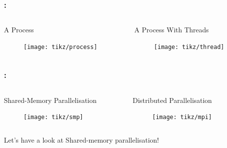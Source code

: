 \documentclass[9pt,xcolor=table]{beamer}
\begin{document}
\begin{frame}
\frametitle{\insertsectionhead{}: \insertsubsectionhead{}}
\begin{columns}[c]
  \begin{column}{.47\textwidth}
    \begin{block}{A Process}
      \begin{figure}[htb]
        \texttt{[image: tikz/process]}
      \end{figure}
    \end{block}
  \end{column}
\pause
    \begin{column}{.47\textwidth}
      \begin{block}{A Process With Threads}
      \begin{figure}[htb]
        \texttt{[image: tikz/thread]}
      \end{figure}
    \end{block}
    \end{column}
  \end{columns}
\end{frame}

\begin{frame}
\frametitle{\insertsectionhead{}: \insertsubsectionhead{}}
\begin{columns}[c]
  \begin{column}{.47\textwidth}
    \begin{block}{Shared-Memory Parallelisation}
      \begin{figure}[htb]
        \texttt{[image: tikz/smp]}
      \end{figure}
    \end{block}
  \end{column}
  \pause
    \begin{column}{.47\textwidth}
      \begin{block}{Distributed Parallelisation}
      \begin{figure}[htb]
        \texttt{[image: tikz/mpi]}
      \end{figure}
    \end{block}
    \end{column}
  \end{columns}
\pause
\begin{center}
  \Large
  Let's have a look at Shared-memory parallelisation!
\end{center}
\end{frame}
\end{document}
